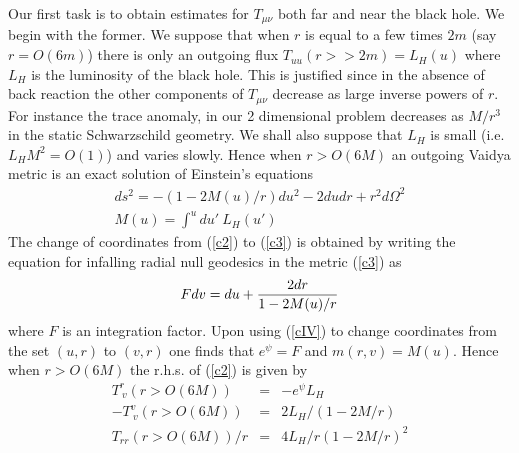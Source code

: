 \documentclass[12pt,oneside]{report}
\begin{document}
Our first task is to obtain estimates for $T_{\mu\nu}$ both far and near
the black hole. We begin with the former. We suppose that when $r$
is equal to a few times $2m$ (say $r=O(6m)$) there is only an outgoing flux
$T_{uu}(r>>2m)=L_H(u)$ where $L_H $ is the luminosity of the black
hole. This is
justified since in the absence of back reaction the other components of
$T_{\mu\nu}$ decrease as large inverse powers of $r$. For instance the trace
anomaly, in our 
2 dimensional problem decreases as $M/r^3$ in the static Schwarzschild
geometry. 
 We shall also suppose that $L_H$ is small 
(i.e. $L_H M^2 =O(1)$) and
varies slowly. Hence when $r>O(6M)$ an outgoing Vaidya metric is an exact
solution of Einstein's equations \begin{eqnarray} &ds^2 = -(1-2 M(u)/ 
r)du^2 - 2 du dr +r^2 d\Omega^2&\nonumber\\ &M(u) = \int^u \! du' \
L_H(u')&\label{c3} \end{eqnarray} 
The change of coordinates from (\ref{c2}) to (\ref{c3})
is obtained by writing the equation for infalling radial null geodesics in
the metric (\ref{c3}) as
\begin{equation}
F dv = du +  {2 dr\over 1 - 2 M(u)/r}\label{cIV}
\end{equation}
where $F$ is an integration factor. Upon using (\ref{cIV}) to change
coordinates from the set $(u,r)$ to $(v,r)$ one
finds that $e^{\psi}=F$ and $m(r,v)=M(u)$. 
Hence when $r>O(6M)$ the r.h.s. of (\ref{c2})
is given by
\begin{eqnarray}
T^r_{\ v}(r>O(6M)) &=& -e^\psi L_H\nonumber\\ 
-T^v_{\ v}(r>O(6M)) &=& 2 L_H/(1-2M/r)\nonumber\\
T_{rr}(r>O(6M))/r &=& 4 L_H / r (1-2M/r)^2\label{cc}\end{eqnarray}
\end{document}

